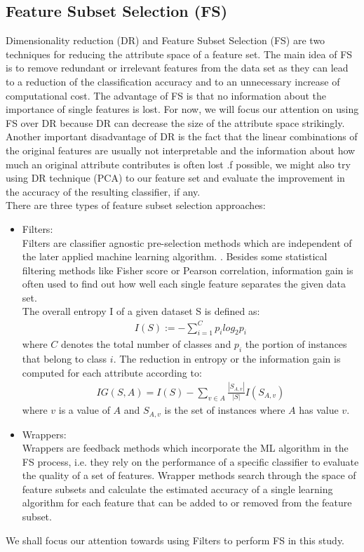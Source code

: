 \documentclass{sig-alternate}
\begin{document}
\subsection{Feature Subset Selection (FS)}
Dimensionality reduction (DR) and Feature Subset Selection (FS) are two techniques for reducing the attribute space of a feature set. The main idea of FS is to remove redundant or irrelevant features from the data set as they can lead to a reduction of the classification accuracy and to an unnecessary increase of computational cost. The advantage of FS is that no information about the importance of single features is lost. For now, we will focus our attention on using FS over DR because DR can decrease the size of the attribute space strikingly. Another important disadvantage of DR is the fact that the linear combinations of the original features are usually not interpretable and the information about how much an original attribute contributes is often lost \cite{mit} .f possible, we might also try using DR technique (PCA) to our feature set and evaluate the improvement in the accuracy of the resulting classifier, if any.\\
There are three types of feature subset selection approaches:
\begin{itemize}
\item Filters:\\
Filters are classifier agnostic pre-selection methods which are independent of the later
applied machine learning algorithm. . Besides some statistical filtering methods like Fisher score or Pearson correlation, information gain is often used to find out
how well each single feature separates the given data set.\\
The overall entropy I of a given dataset S is defined as:
\begin{align}
I(S) := - \sum_{i=1}^{C} p_i log_2 p_i
\end{align}
where $C$ denotes the total number of classes and $p_i$ the portion of instances that belong to class $i$. The reduction in entropy or the information gain is computed for each attribute according to:
\begin{align}
IG(S,A) = I(S) - \sum_{v \in A} \frac{|S_{A,v}|}{|S|}I(S_{A,v})
\end{align}
where $v$ is a value of $A$ and $S_{A,v}$ is the set of instances where $A$ has value $v$.
\item Wrappers:\\
Wrappers are feedback methods which incorporate the ML algorithm in the FS process,
i.e. they rely on the performance of a specific classifier to evaluate the quality of a set of features. Wrapper methods search through the space of feature subsets and calculate
the estimated accuracy of a single learning algorithm for each feature that can be added
to or removed from the feature subset.
\end{itemize} 
We shall focus our attention towards using Filters to perform FS in this study.
\end{document}
